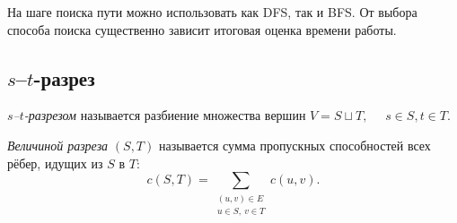 \begin{Remark}{}{}
	На шаге поиска пути можно использовать как DFS, так и BFS. От выбора способа поиска существенно зависит итоговая оценка времени работы.
\end{Remark}

\subsection{\texorpdfstring{$s$--$t$}{s-t}-разрез}

\begin{Definition}{}{}
	\emph{$s$--$t$-разрезом} называется разбиение множества вершин $V=S \sqcup T,$ 
	$\quad s\in S, t\in T.$
\end{Definition}

\begin{Definition}{}{}
	\emph{Величиной разреза} $(S,T)$ называется сумма пропускных способностей всех рёбер, идущих из $S$ в $T$:
	\[
	c(S,T)=\sum_{\substack{(u,v)\in E\\ u\in S,\ v\in T}} c(u,v).
	\]
\end{Definition}

